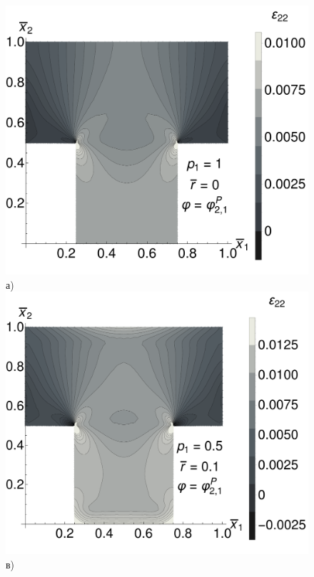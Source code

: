\begin{figure}[ht]
    \begin{minipage}[b][][b]{0.49\linewidth}\centering
        \includegraphics[width=\linewidth]{pics/TEpsR0.pdf} \\ а)
        \includegraphics[width=\linewidth]{pics/TEpsR01.pdf} \\ в)
    \end{minipage}
    \hfill
    \begin{minipage}[b][][b]{0.49\linewidth}\centering

\end{minipage}
\end{figure}
